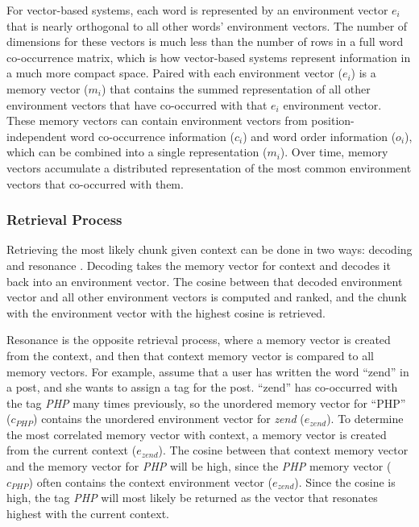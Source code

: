 \documentclass[man,floatsintext,donotrepeattitle]{apa6}
\begin{document}
For vector-based systems, each word is represented by an environment vector $e_{i}$ that is nearly orthogonal to all other words' environment vectors.
The number of dimensions for these vectors is much less than the number of rows in a full word co-occurrence matrix, which is how vector-based systems represent information in a much more compact space.
Paired with each environment vector ($e_{i}$) is a memory vector ($m_{i}$) that contains the summed representation of all other environment vectors that have co-occurred with that $e_{i}$ environment vector.
These memory vectors can contain environment vectors from position-independent word co-occurrence information ($c_{i}$) and word order information ($o_{i}$), which can be combined into a single representation ($m_{i}$).
Over time, memory vectors accumulate a distributed representation of the most common environment vectors that co-occurred with them.

\subsubsection{Retrieval Process}

Retrieving the most likely chunk given context can be done in two ways: decoding and resonance \parencite{Jones2007}.
Decoding takes the memory vector for context and decodes it back into an environment vector.
The cosine between that decoded environment vector and all other environment vectors is computed and ranked, and the chunk with the environment vector with the highest cosine is retrieved.

Resonance is the opposite retrieval process, where a memory vector is created from the context, and then that context memory vector is compared to all memory vectors.
For example, assume that a user has written the word ``zend'' in a post, and she wants to assign a tag for the post.
``zend'' has co-occurred with the tag \emph{PHP} many times previously, so the unordered memory vector for ``PHP'' ($c_{\mathit{PHP}}$) contains the unordered environment vector for \emph{zend} ($e_{zend}$).
To determine the most correlated memory vector with context, a memory vector is created from the current context ($e_{zend}$).
The cosine between that context memory vector and the memory vector for \emph{PHP} will be high, since the \emph{PHP} memory vector ($c_{\mathit{PHP}}$) often contains the context environment vector ($e_{zend}$).
Since the cosine is high, the tag \emph{PHP} will most likely be returned as the vector that resonates highest with the current context.
\end{document}

